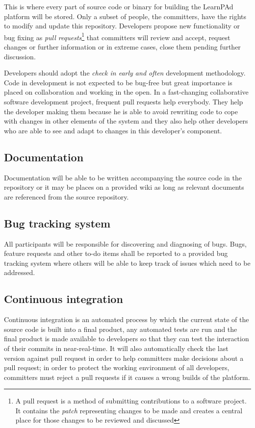This is where every part of source code or binary for building the LearnPAd platform will be stored.  Only a subset of people, the committers, have the rights to modify and update this repository.  Developers propose new functionality or bug fixing as \emph{pull requests}\footnote{A pull request is a method of submitting contributions to a software project. It contains the \emph{patch} representing changes to be made and creates a central place for those changes to be reviewed and discussed} that committers will review and accept, request changes or further information or in extreme cases, close them pending further discussion. 

Developers should adopt the \emph{check in early and often} development methodology. Code in development is not expected to be bug-free but great importance is placed on collaboration and working in the open. In a fast-changing collaborative software development project, frequent pull requests help everybody. They help the developer making them because he is able to avoid rewriting code to cope with changes in other elements of the system and they also help other developers who are able to see and adapt to changes in this developer's component.

\subsection{Documentation}
\label{sec:documentation}

Documentation will be able to be written accompanying the source code in the repository or it may be places on a provided wiki as long as relevant documents are referenced from the source repository.

\subsection{Bug tracking system}
\label{sec:bug tracking-system}

All participants will be responsible for discovering and diagnosing of bugs. Bugs, feature requests and other to-do items shall be reported to a provided bug tracking system where others will be able to keep track of issues which need to be addressed.

\subsection{Continuous integration}
\label{sec:continuous-integration}

Continuous integration is an automated process by which the current state of the source code is built into a final product, any automated tests are run and the final product is made available to developers so that they can test the interaction of their commits in near-real-time. It will also automatically check the last version against pull request in order to help committers make decisions about a pull request; in order to protect the working environment of all developers, committers must reject a pull requests if it causes a wrong builds of the platform.

